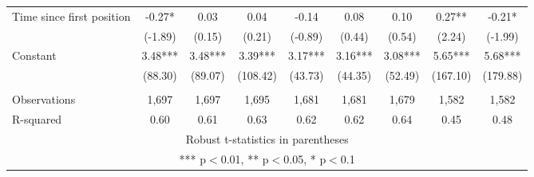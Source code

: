 \documentclass[]{article}
\begin{document}
\begin{tabular}{lcccccccc}
Time since first position & -0.27* & 0.03 & 0.04 & -0.14 & 0.08 & 0.10 & 0.27** & -0.21* \\
 & (-1.89) & (0.15) & (0.21) & (-0.89) & (0.44) & (0.54) & (2.24) & (-1.99) \\
Constant & 3.48*** & 3.48*** & 3.39*** & 3.17*** & 3.16*** & 3.08*** & 5.65*** & 5.68*** \\
 & (88.30) & (89.07) & (108.42) & (43.73) & (44.35) & (52.49) & (167.10) & (179.88) \\
 &  &  &  &  &  &  &  &  \\
Observations & 1,697 & 1,697 & 1,695 & 1,681 & 1,681 & 1,679 & 1,582 & 1,582 \\
 R-squared & 0.60 & 0.61 & 0.63 & 0.62 & 0.62 & 0.64 & 0.45 & 0.48 \\ \hline
\multicolumn{9}{c}{ Robust t-statistics in parentheses} \\
\multicolumn{9}{c}{ *** p$<$0.01, ** p$<$0.05, * p$<$0.1} \\
\end{tabular}
\end{document}
